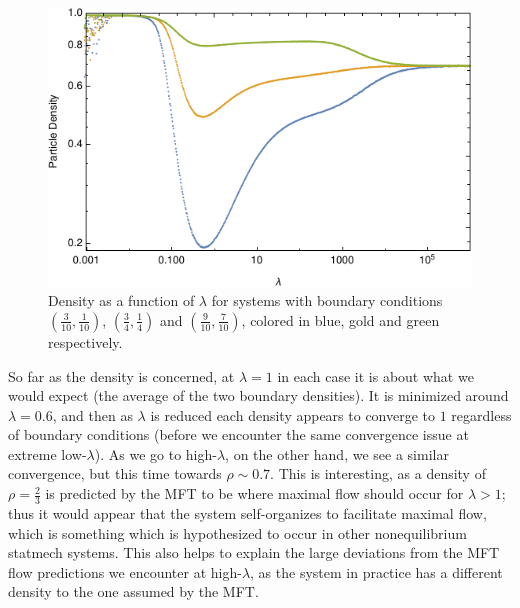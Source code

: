 \documentclass[
reprint,
 amsmath,amssymb,
 aps,
 prl,
]{revtex4-1}
\begin{document}
\begin{figure}[h!]
\vspace{1em}
\caption{\label{fig:largeDensity} Density as a function of $\lambda$ for systems with boundary conditions $(\frac{3}{10}, \frac{1}{10})$, $(\frac{3}{4}, \frac{1}{4})$ and $(\frac{9}{10}, \frac{7}{10})$, colored in blue, gold and green
respectively.}
    \includegraphics[width=0.95\linewidth]{largeRangeDensity}
    \vspace{0em}
\end{figure}
So far as the density is concerned, at $\lambda=1$ in each case it is about what we would expect (the average of the two boundary densities). It is minimized around $\lambda = 0.6$, and then as $\lambda$ is reduced each density appears to 
converge to $1$ regardless of boundary conditions (before we encounter the same convergence issue at extreme low-$\lambda$). As we go to high-$\lambda$, on the other hand, we see a similar convergence, but this time towards $\rho \sim 0.7$.
This is interesting, as a density of $\rho=\frac{2}{3}$ is predicted by the MFT to be where maximal flow should occur for $\lambda>1$; thus it would appear that the system self-organizes to facilitate maximal flow, which is something which
is hypothesized to occur in other nonequilibrium statmech systems. This also helps to explain the large deviations from the MFT flow predictions we encounter at high-$\lambda$, as the system in practice has a different density to the one assumed
by the MFT.
\end{document}
